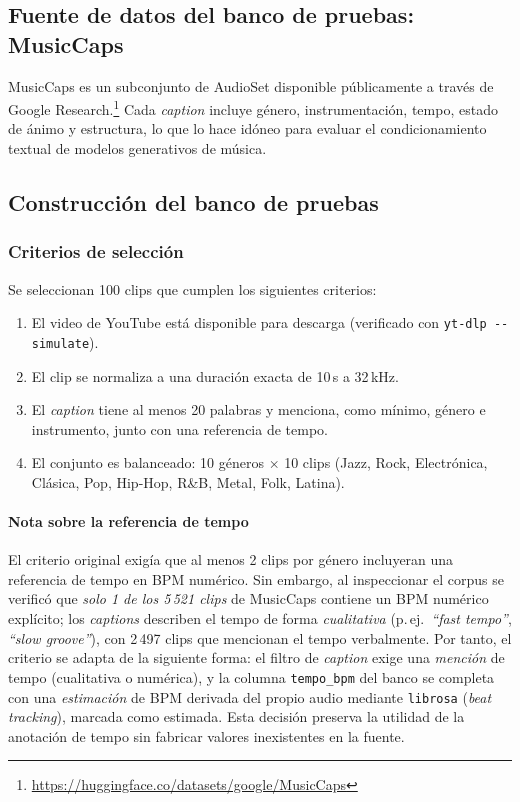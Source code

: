 \subsection{Fuente de datos del banco de pruebas: MusicCaps}
\label{sec:datos:musiccaps}

MusicCaps es un subconjunto de AudioSet disponible públicamente a través de
Google Research.\footnote{\url{https://huggingface.co/datasets/google/MusicCaps}}
Cada \textit{caption} incluye género, instrumentación, tempo, estado de ánimo
y estructura, lo que lo hace idóneo para evaluar el condicionamiento textual
de modelos generativos de música.

\subsection{Construcción del banco de pruebas}
\label{sec:datos:testset}

\subsubsection{Criterios de selección}

Se seleccionan 100 clips que cumplen los siguientes criterios:

\begin{enumerate}
  \item El video de YouTube está disponible para descarga (verificado con
        \texttt{yt-dlp -{}-simulate}).
  \item El clip se normaliza a una duración exacta de 10\,s a 32\,kHz.
  \item El \textit{caption} tiene al menos 20 palabras y menciona, como
        mínimo, género e instrumento, junto con una referencia de tempo.
  \item El conjunto es balanceado: 10 géneros $\times$ 10 clips
        (Jazz, Rock, Electrónica, Clásica, Pop, Hip-Hop, R\&B, Metal, Folk,
        Latina).
\end{enumerate}

\paragraph{Nota sobre la referencia de tempo}
El criterio original exigía que al menos 2 clips por género incluyeran una
referencia de tempo en BPM numérico. Sin embargo, al inspeccionar el corpus
se verificó que \emph{solo 1 de los 5\,521 clips} de MusicCaps contiene un BPM
numérico explícito; los \textit{captions} describen el tempo de forma
\emph{cualitativa} (p.\,ej.\ \textit{``fast tempo''}, \textit{``slow
groove''}), con 2\,497 clips que mencionan el tempo verbalmente.
Por tanto, el criterio se adapta de la siguiente forma: el filtro de
\textit{caption} exige una \emph{mención} de tempo (cualitativa o numérica),
y la columna \texttt{tempo\_bpm} del banco se completa con una
\emph{estimación} de BPM derivada del propio audio mediante
\texttt{librosa} (\textit{beat tracking}), marcada como estimada.
Esta decisión preserva la utilidad de la anotación de tempo sin fabricar
valores inexistentes en la fuente.

